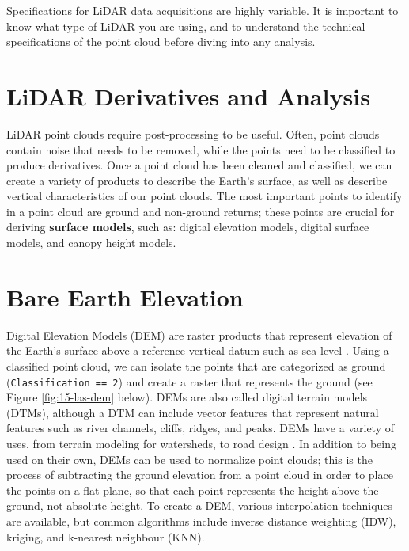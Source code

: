 \documentclass[
]{book}
\begin{document}
Specifications for LiDAR data acquisitions are highly variable. It is important to know what type of LiDAR you are using, and to understand the technical specifications of the point cloud before diving into any analysis.

\section{LiDAR Derivatives and Analysis}\label{lidar-derivatives-and-analysis}

LiDAR point clouds require post-processing to be useful. Often, point clouds contain noise that needs to be removed, while the points need to be classified to produce derivatives. Once a point cloud has been cleaned and classified, we can create a variety of products to describe the Earth's surface, as well as describe vertical characteristics of our point clouds. The most important points to identify in a point cloud are ground and non-ground returns; these points are crucial for deriving \textbf{surface models}, such as: digital elevation models, digital surface models, and canopy height models.

\section{Bare Earth Elevation}\label{bare-earth-elevation}

Digital Elevation Models (DEM) are raster products that represent elevation of the Earth's surface above a reference vertical datum such as sea level \citep{white_best_2013}. Using a classified point cloud, we can isolate the points that are categorized as ground (\texttt{Classification\ ==\ 2}) and create a raster that represents the ground (see Figure \ref{fig:15-las-dem} below). DEMs are also called digital terrain models (DTMs), although a DTM can include vector features that represent natural features such as river channels, cliffs, ridges, and peaks. DEMs have a variety of uses, from terrain modeling for watersheds, to road design \citep{roussel_lidr_2021}. In addition to being used on their own, DEMs can be used to normalize point clouds; this is the process of subtracting the ground elevation from a point cloud in order to place the points on a flat plane, so that each point represents the height above the ground, not absolute height. To create a DEM, various interpolation techniques are available, but common algorithms include inverse distance weighting (IDW), kriging, and k-nearest neighbour (KNN).
\end{document}
